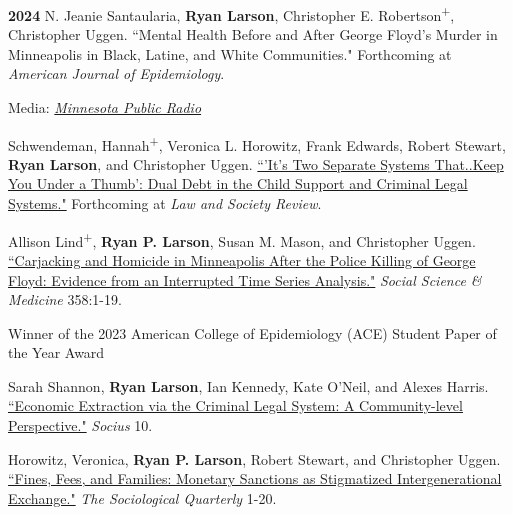 \documentclass[letterpaper]{article}
\newenvironment{publist}{%
  \begin{list}{}{%
    \setlength{\leftmargin}{0cm}   %
    \setlength{\labelwidth}{2cm}     %
    \setlength{\labelsep}{0.5cm}     %
  }%
}{%
  \end{list}%
}
\renewenvironment{itemize}{
  \begin{list}{}{
    \setlength{\leftmargin}{1.5em}
  }
}{
  \end{list}
}
\begin{document}
\begin{publist}

\item[\textbf{2024}]  N. Jeanie Santaularia, \textbf{Ryan Larson}, Christopher E. Robertson\textsuperscript{+}, Christopher Uggen. ``Mental Health Before and After George Floyd’s Murder in Minneapolis in Black, Latine, and White Communities." Forthcoming at \textit{American Journal of Epidemiology}.

\begin{itemize}
\item Media: \href{https://www.mprnews.org/story/2024/09/19/black-minneapolis-residents-bear-heaviest-mental-health-burden-after-george-floyds-murder}{\textit{Minnesota Public Radio}}
\end{itemize}

\item Schwendeman, Hannah\textsuperscript{+}, Veronica L. Horowitz, Frank Edwards, Robert Stewart, \textbf{Ryan Larson}, and Christopher Uggen. \href{https://ryanplarson.github.io/personal_site/pubs/schwendeman_etal_24.pdf}{``'It's Two Separate Systems That..Keep You Under a Thumb': Dual Debt in the Child Support and Criminal Legal Systems."} Forthcoming at \textit{Law and Society Review}. 

\item Allison Lind\textsuperscript{+}, \textbf{Ryan P. Larson}, Susan M. Mason, and Christopher Uggen. \href{https://ryanplarson.github.io/personal_site/pubs/lind_etal_24.pdf}{``Carjacking and Homicide in Minneapolis After the Police Killing of George Floyd:  Evidence from an Interrupted Time Series Analysis."} \textit{Social Science \& Medicine} 358:1-19.

\begin{itemize}
\item Winner of the 2023 American College of Epidemiology (ACE) Student Paper of the Year Award
\end{itemize}

\item Sarah Shannon, \textbf{Ryan Larson}, Ian Kennedy,  Kate O'Neil, and Alexes Harris. \href{https://ryanplarson.github.io/personal_site/pubs/shannon_etal_24.pdf}{``Economic Extraction via the Criminal Legal System: A Community-level Perspective."} \textit{Socius} 10. 

\item Horowitz, Veronica, \textbf{Ryan P. Larson}, Robert Stewart, and Christopher Uggen. \href{https://ryanplarson.github.io/personal_site/pubs/horowitz_etal_24.pdf}{``Fines, Fees, and Families: Monetary Sanctions as Stigmatized Intergenerational Exchange."} \textit{The Sociological Quarterly} 1-20.


\end{publist}
\end{document}
